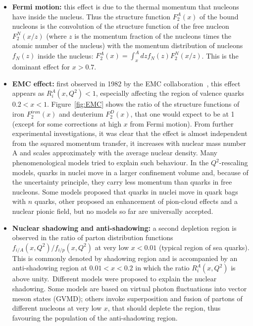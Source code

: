 \begin{itemize}
\item {\bf Fermi motion:} this effect is due to the 
thermal momentum that nucleons have inside the nucleus. 
Thus the structure function $F^A_2(x)$ of the bound nucleons
is the convolution of the structure function of the free nucleon 
$F^N_2(x/z)$ (where $z$ is the momentum fraction
of the nucleons times the atomic number of the nucleus) 
with the momentum distribution
of nucleons $f_N(z)$ inside the nucleus: 
$F^A_2(x) = \int_x^A dz f_N(z) F_2^N(x/z)$.
This is the dominant effect for $x > 0.7$.
\item {\bf EMC effect:} first observed in 1982 by the EMC collaboration~\cite{Aubert:1983xm},
this effect appears as $R_i^A(x,Q^2)<1$, especially affecting the region 
of valence quarks $0.2 < x < 1$. Figure~\ref{fig:EMC} shows the ratio of the structure functions 
of iron $F^{iron}_2(x)$ and deuterium $F^D_2(x)$, that one would expect to be at 1 (except for 
some corrections at high $x$ from Fermi motion). From further
experimental investigations, it was clear that the effect is almost independent from the 
squared momentum transfer, it increases with nuclear mass 
number A and scales approximately with the average nuclear density. 
Many phenomenological models tried to explain such behaviour. 
In the $Q^2$-rescaling models, 
quarks in nuclei move in a larger confinement volume and, 
because of the uncertainty principle, 
they carry less momentum than quarks in free nucleons. 
Some models proposed that 
quarks in nuclei move in quark bags with $n$ quarks, 
other proposed an enhancement 
of pion-cloud effects and a nuclear pionic field, 
but no models so far are universally accepted. 

\item {\bf Nuclear shadowing and anti-shadowing:} a second depletion region
is observed in the ratio of parton distribution functions $f_{i/A}(x,Q^2) / f_{i/p}(x,Q^2)$ 
at very low $x<0.01$ (typical region of sea quarks). This is commonly denoted 
by shadowing region and is accompanied by
an anti-shadowing region at $0.01 < x < 0.2$ in which the ratio $R_i^A(x,Q^2)$
is above unity.~Different models were
proposed to explain the nuclear shadowing. Some models are based on virtual 
photon fluctuations into vector meson states (GVMD); others
invoke superposition and fusion of partons of different nucleons at very low $x$, that should deplete the 
region, thus favouring the population of the anti-shadowing region.

\end{itemize}


